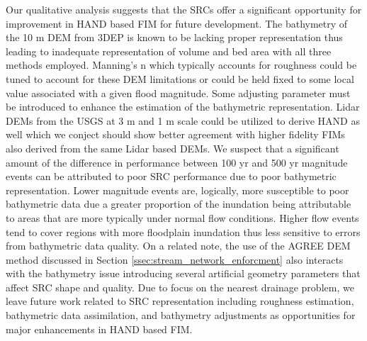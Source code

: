 Our qualitative analysis suggests that the SRCs offer a significant opportunity for improvement in HAND based FIM for future development.
The bathymetry of the 10 m DEM from 3DEP is known to be lacking proper representation thus leading to inadequate representation of volume and bed area with all three methods employed.
Manning's n which typically accounts for roughness could be tuned to account for these DEM limitations or could be held fixed to some local value associated with a given flood magnitude.
Some adjusting parameter must be introduced to enhance the estimation of the bathymetric representation.
Lidar DEMs from the USGS at 3 m and 1 m scale could be utilized to derive HAND as well which we conject should show better agreement with higher fidelity FIMs also derived from the same Lidar based DEMs.
We suspect that a significant amount of the difference in performance between 100 yr and 500 yr magnitude events can be attributed to poor SRC performance due to poor bathymetric representation.
Lower magnitude events are, logically, more susceptible to poor bathymetric data due a greater proportion of the inundation being attributable to areas that are more typically under normal flow conditions.
Higher flow events tend to cover regions with more floodplain inundation thus less sensitive to errors from bathymetric data quality.
On a related note, the use of the AGREE DEM method discussed in Section \ref{ssec:stream_network_enforcment} also interacts with the bathymetry issue introducing several artificial geometry parameters that affect SRC shape and quality.
Due to focus on the nearest drainage problem, we leave future work related to SRC representation including roughness estimation, bathymetric data assimilation, and bathymetry adjustments as opportunities for major enhancements in HAND based FIM.

